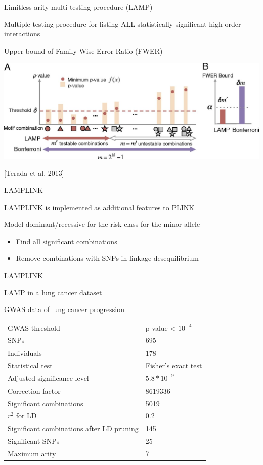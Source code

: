 \documentclass[ignorenonframetext,]{beamer}
\providecommand{\tightlist}{%
\setlength{\itemsep}{0pt}\setlength{\parskip}{0pt}}
\begin{document}
\begin{frame}{Limitless arity multi-testing procedure (LAMP)}

Multiple testing procedure for listing ALL statistically significant
high order interactions

\pause

Upper bound of Family Wise Error Ratio (FWER)

\includegraphics{images/F2.large.jpg}

{[}Terada et al. 2013{]}

\end{frame}

\begin{frame}{LAMPLINK}

LAMPLINK is implemented as additional features to PLINK

\pause

Model dominant/recessive for the risk class for the minor allele

\pause

\begin{itemize}
\tightlist
\item
  Find all significant combinations
\item
  Remove combinations with SNPs in linkage desequilibrium
\end{itemize}

\end{frame}

\begin{frame}{LAMPLINK}

\begin{block}{LAMP in a lung cancer dataset}

GWAS data of lung cancer progression

\begin{longtable}[]{@{}ll@{}}
\toprule
GWAS threshold & p-value \textless{} \(10^{-4}\)\tabularnewline
SNPs & 695\tabularnewline
Individuals & 178\tabularnewline
Statistical test & Fisher's exact test\tabularnewline
Adjusted significance level & \(5.8*10^{-9}\)\tabularnewline
Correction factor & 8619336\tabularnewline
Significant combinations & 5019\tabularnewline
\(r^2\) for LD & 0.2\tabularnewline
Significant combinations after LD pruning & 145\tabularnewline
Significant SNPs & 25\tabularnewline
Maximum arity & 7\tabularnewline
\bottomrule
\end{longtable}

\end{block}

\end{frame}
\end{document}
